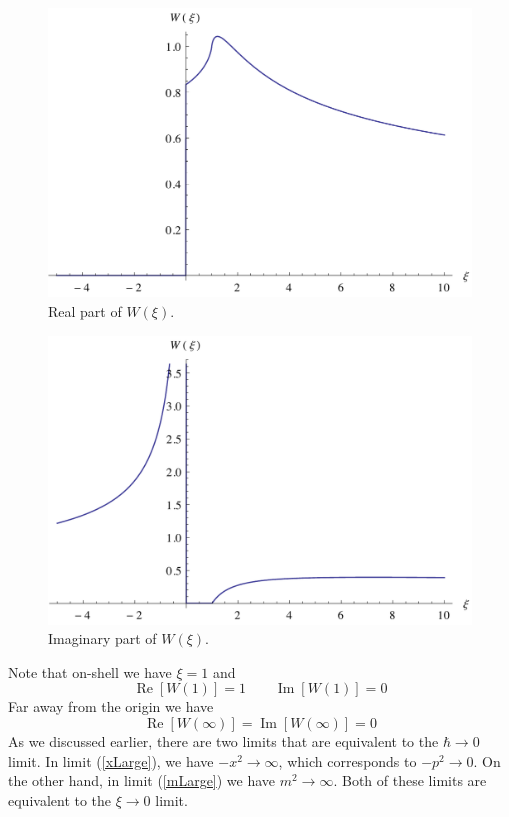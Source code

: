 \begin{figure}
\centering
\includegraphics[scale=0.6]{Plots/ReW4.pdf}
\caption[Real part of $W(\xi)$]{Real part of $W(\xi)$.}
\label{ReW4Fig}
\end{figure}

\begin{figure}
\centering
\includegraphics[scale=0.6]{Plots/ImW4.pdf}
\caption[Imaginary part of $W(\xi)$]{Imaginary part of $W(\xi)$.}
\label{ImW4Fig}
\end{figure}

Note that on-shell we have $\xi = 1$ and
\begin{equation}
	\operatorname{Re}{[W(1)]} = 1 \qquad \operatorname{Im}{[W(1)]} = 0
\end{equation}
Far away from the origin we have
\begin{equation}
	\operatorname{Re}{[W(\infty)]} = \operatorname{Im}{[W(\infty)]} = 0
\end{equation}
As we discussed earlier, there are two limits that are equivalent to the $\hbar \rightarrow 0$ limit. In limit (\ref{xLarge}), we have $-x^{2} \rightarrow \infty$, which corresponds to $-p^{2} \rightarrow 0$. On the other hand, in limit (\ref{mLarge}) we have $m^{2} \rightarrow \infty$. Both of these limits are equivalent to the $\xi \rightarrow 0$ limit.
